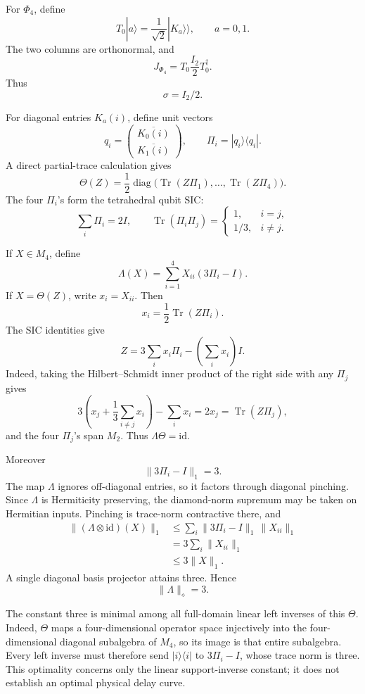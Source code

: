 \documentclass[11pt,a4paper]{article}
\numberwithin{equation}{section}
\begin{document}
For \(\Phi_4\), define \[
T_0|a\rangle
=
\frac1{\sqrt2}|K_a\rangle\!\rangle,
\qquad a=0,1.
\] The two columns are orthonormal, and \[
J_{\Phi_4}=T_0\frac{I_2}{2}T_0^\dagger.
\] Thus \[
\sigma=I_2/2.
\]

For diagonal entries \(K_a(i)\), define unit vectors \[
q_i=
\begin{pmatrix}
\overline{K_0(i)}\\
\overline{K_1(i)}
\end{pmatrix},
\qquad
\Pi_i=|q_i\rangle\langle q_i|.
\] A direct partial-trace calculation gives \[
\Theta(Z)
=
\frac12
\operatorname{diag}
\bigl(
\operatorname{Tr}(Z\Pi_1),\ldots,
\operatorname{Tr}(Z\Pi_4)
\bigr).
\tag{7.1}
\] The four \(\Pi_i\)'s form the tetrahedral qubit SIC: \[
\sum_i\Pi_i=2I,
\qquad
\operatorname{Tr}(\Pi_i\Pi_j)=
\begin{cases}
1,&i=j,\\
1/3,&i\ne j.
\end{cases}
\tag{7.2}
\]

If \(X\in M_4\), define \[
\Lambda(X)
=
\sum_{i=1}^4
X_{ii}(3\Pi_i-I).
\tag{7.3}
\] If \(X=\Theta(Z)\), write \(x_i=X_{ii}\). Then \[
x_i=\frac12\operatorname{Tr}(Z\Pi_i).
\] The SIC identities give \[
Z
=
3\sum_i x_i\Pi_i
-
\left(\sum_i x_i\right)I.
\tag{7.4}
\] Indeed, taking the Hilbert--Schmidt inner product of the right side
with any \(\Pi_j\) gives \[
3\left(x_j+\frac13\sum_{i\ne j}x_i\right)
-\sum_i x_i
=
2x_j
=
\operatorname{Tr}(Z\Pi_j),
\] and the four \(\Pi_j\)'s span \(M_2\). Thus
\(\Lambda\Theta=\mathrm{id}\).

Moreover \[
\|3\Pi_i-I\|_1=3.
\] The map \(\Lambda\) ignores off-diagonal entries, so it factors
through diagonal pinching. Since \(\Lambda\) is Hermiticity preserving,
the diamond-norm supremum may be taken on Hermitian inputs. Pinching is
trace-norm contractive there, and \[
\begin{aligned}
\|(\Lambda\otimes\mathrm{id})(X)\|_1
&\le
\sum_i
\|3\Pi_i-I\|_1\,\|X_{ii}\|_1\\
&=
3\sum_i\|X_{ii}\|_1\\
&\le3\|X\|_1.
\end{aligned}
\] A single diagonal basis projector attains three. Hence \[
\boxed{\|\Lambda\|_\diamond=3.}
\tag{7.5}
\]

The constant three is minimal among all full-domain linear left inverses
of this \(\Theta\). Indeed, \(\Theta\) maps a four-dimensional operator
space injectively into the four-dimensional diagonal subalgebra of
\(M_4\), so its image is that entire subalgebra. Every left inverse must
therefore send \(|i\rangle\langle i|\) to \(3\Pi_i-I\), whose trace norm
is three. This optimality concerns only the linear support-inverse
constant; it does not establish an optimal physical delay curve.
\end{document}
